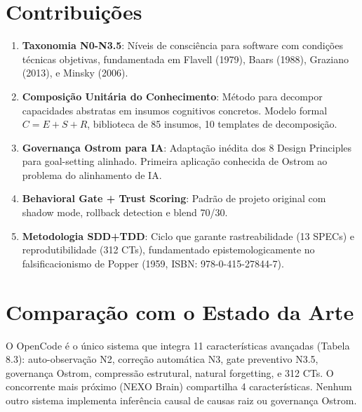 \section{Contribuições}

\begin{enumerate}
    \item \textbf{Taxonomia N0-N3.5}: Níveis de consciência para software com condições técnicas objetivas, fundamentada em Flavell (1979), Baars (1988), Graziano (2013), e Minsky (2006).
    \item \textbf{Composição Unitária do Conhecimento}: Método para decompor capacidades abstratas em insumos cognitivos concretos. Modelo formal $C = E + S + R$, biblioteca de 85 insumos, 10 templates de decomposição.
    \item \textbf{Governança Ostrom para IA}: Adaptação inédita dos 8 Design Principles para goal-setting alinhado. Primeira aplicação conhecida de Ostrom ao problema do alinhamento de IA.
    \item \textbf{Behavioral Gate + Trust Scoring}: Padrão de projeto original com shadow mode, rollback detection e blend 70/30.
    \item \textbf{Metodologia SDD+TDD}: Ciclo que garante rastreabilidade (13 SPECs) e reprodutibilidade (312 CTs), fundamentado epistemologicamente no falsificacionismo de Popper (1959, ISBN: 978-0-415-27844-7).
\end{enumerate}

\section{Comparação com o Estado da Arte}

O OpenCode é o único sistema que integra 11 características avançadas (Tabela 8.3): auto-observação N2, correção automática N3, gate preventivo N3.5, governança Ostrom, compressão estrutural, natural forgetting, e 312 CTs. O concorrente mais próximo (NEXO Brain) compartilha 4 características. Nenhum outro sistema implementa inferência causal de causas raiz ou governança Ostrom.

